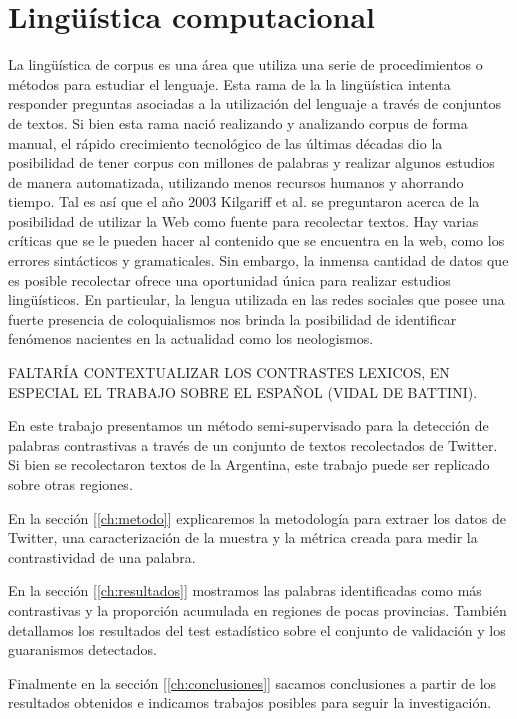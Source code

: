 

\section{Lingüística computacional} %
\label{linguistica_computacional}

La lingüística de corpus es una área que utiliza una serie de procedimientos o métodos para estudiar el lenguaje. Esta rama de la la lingüística intenta responder 
preguntas asociadas a la utilización del lenguaje a través de conjuntos de textos. Si bien esta rama nació realizando y analizando corpus de forma manual, el rápido crecimiento
tecnológico de las últimas décadas dio la posibilidad de tener corpus con millones de palabras y realizar algunos estudios de manera automatizada, utilizando menos recursos humanos y ahorrando tiempo. 
Tal es así que el año 2003 Kilgariff et al. \cite{kilgarriff2003introduction} se preguntaron acerca de la posibilidad de utilizar la Web como fuente para recolectar textos. Hay varias críticas que se le pueden hacer al contenido que se encuentra en la web, como los errores sintácticos y  gramaticales. Sin embargo, la inmensa cantidad de datos que es posible recolectar ofrece una oportunidad única para realizar estudios lingüísticos. En particular, la lengua utilizada en las redes sociales que posee una fuerte presencia de coloquialismos nos brinda la posibilidad de identificar fenómenos nacientes en la actualidad como los neologismos.

FALTARÍA CONTEXTUALIZAR LOS CONTRASTES LEXICOS, EN ESPECIAL EL TRABAJO SOBRE EL ESPAÑOL (VIDAL DE BATTINI).

\cite{baayen2001word}
\cite{mcenery2011corpus}


En este trabajo presentamos un método semi-supervisado para la detección de palabras contrastivas a través de un conjunto de textos recolectados de Twitter. Si bien se recolectaron textos de la Argentina, este trabajo puede ser replicado sobre otras regiones.

En la sección [\ref{ch:metodo}]
explicaremos la metodología para extraer los datos de Twitter, una caracterización de la muestra y la métrica creada para medir la contrastividad de una palabra.

En la sección [\ref{ch:resultados}] mostramos las palabras identificadas como más contrastivas y la proporción acumulada en regiones de pocas provincias. También detallamos los resultados del test estadístico sobre el conjunto de validación y los guaranismos detectados. 

Finalmente en la sección [\ref{ch:conclusiones}] sacamos conclusiones a partir de los resultados obtenidos e indicamos trabajos posibles para seguir la investigación.